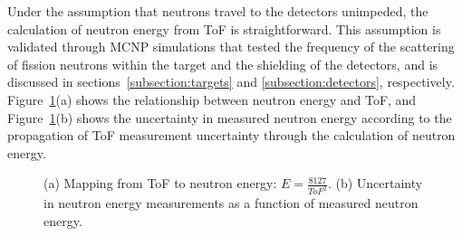 Under the assumption that neutrons travel to the detectors unimpeded, the calculation of neutron energy from ToF is straightforward.
This assumption is validated through MCNP simulations that tested the frequency of the scattering of fission neutrons within the target and the shielding of the detectors, and is discussed in sections~\ref{subsection:targets} and \ref{subsection:detectors}, respectively.
Figure~\ref{fig:ErgUncertainty}(a) shows the relationship between neutron energy and ToF, and Figure~\ref{fig:ErgUncertainty}(b) shows the uncertainty in measured neutron energy according to the propagation of ToF measurement uncertainty through the calculation of neutron energy.
\begin{figure}[]
    \caption{(a) Mapping from ToF to neutron energy: $E = \frac{8127}{ToF^{2}}$.
    (b) Uncertainty in neutron energy measurements as a function of measured neutron energy.}
    \label{fig:ErgUncertainty}
\end{figure}

